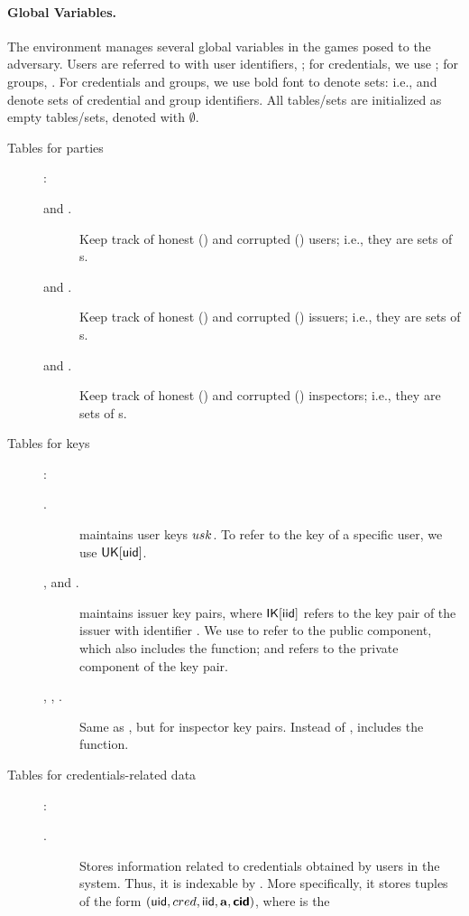 \paragraph{Global Variables.} %
The environment manages several global variables in the games posed to the
adversary. Users are referred to with user identifiers, \uid; for credentials,
we use \cid; for groups, \gid. For credentials and groups, we use bold font to
denote sets: i.e., \scid and \sgid denote sets of credential and group
identifiers. All tables/sets are initialized as empty tables/sets, denoted
with $\emptyset$.

\begin{description}
\item[Tables for parties]:
  \begin{description}
  \item[\HU and \CU.] Keep track of honest (\HU) and corrupted (\CU) users;
    i.e., they are sets of {\uid}s.
  \item[\HI and \CI.] Keep track of honest (\HI) and corrupted (\CI) issuers;
    i.e., they are sets of {\iid}s.
  \item[\HO and \CO.] Keep track of honest (\HO) and corrupted (\CO) inspectors;
    i.e., they are sets of {\oid}s.
  \end{description}
\item[Tables for keys]:
  \begin{description}
  \item[\UK.] \UK maintains user keys $usk$. To refer to the key of a specific
    user, we use $\mathsf{UK}[\mathsf{uid}]$. 
  \item[\IK, \PUBIK and \PRVIK.] \IK maintains issuer key pairs, where
    $\mathsf{IK}[\mathsf{iid}]$ refers to the key pair of the issuer with identifier \iid. We
    use \PUBIK to refer to the public component, which also includes the \fissue
    function; and \PRVIK refers to the private component of the key pair.
  \item[\OK, \PUBOK, \PRVOK.] Same as \IK, but for inspector key pairs. Instead
    of \fissue, \OK includes the \finsp function.
  \end{description}
\item[Tables for credentials-related data]:
  \begin{description}
  \item[\CRED.] Stores information related to credentials obtained by users in
    the system. Thus, it is indexable by \cid. More specifically, it stores
    tuples of the form $(\mathsf{uid},cred,\mathsf{iid},\mathbf{a},\boldsymbol{\mathsf{cid}})$, where \uid is the

\end{description}
\end{description}
